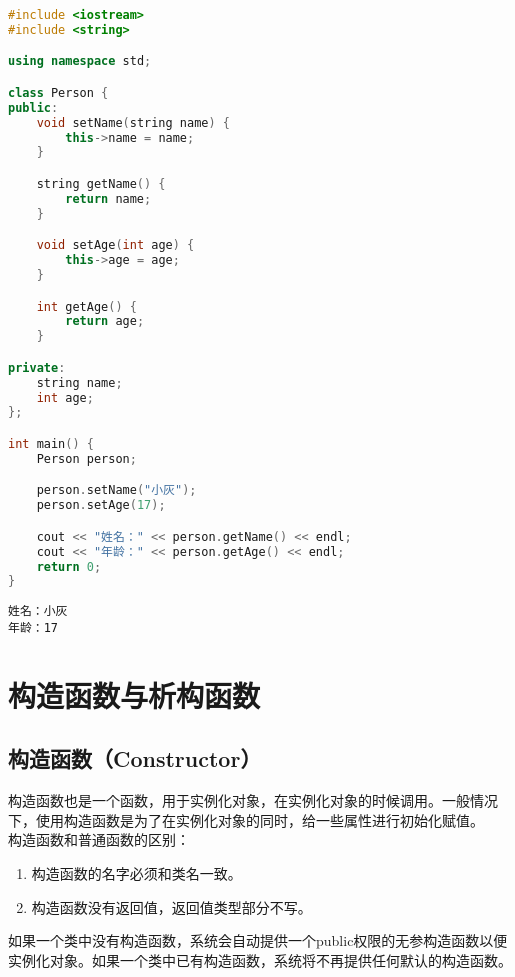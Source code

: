 \begin{lstlisting}[language=C++]
#include <iostream>
#include <string>

using namespace std;

class Person {
public:
    void setName(string name) {
        this->name = name;
    }

    string getName() {
        return name;
    }

    void setAge(int age) {
        this->age = age;
    }

    int getAge() {
        return age;
    }

private:
    string name;
    int age;
};

int main() {
    Person person;

    person.setName("小灰");
    person.setAge(17);

    cout << "姓名：" << person.getName() << endl;
    cout << "年龄：" << person.getAge() << endl;
    return 0;
}
\end{lstlisting}

\begin{tcolorbox}
	\begin{verbatim}
姓名：小灰
年龄：17
	\end{verbatim}
\end{tcolorbox}

\newpage

\section{构造函数与析构函数}

\subsection{构造函数（Constructor）}

构造函数也是一个函数，用于实例化对象，在实例化对象的时候调用。一般情况下，使用构造函数是为了在实例化对象的同时，给一些属性进行初始化赋值。 \\

构造函数和普通函数的区别：

\begin{enumerate}
	\item 构造函数的名字必须和类名一致。
	\item 构造函数没有返回值，返回值类型部分不写。
\end{enumerate}

如果一个类中没有构造函数，系统会自动提供一个public权限的无参构造函数以便实例化对象。如果一个类中已有构造函数，系统将不再提供任何默认的构造函数。 \\

